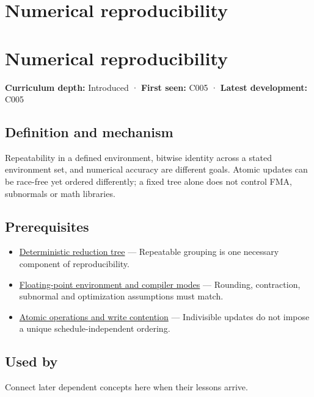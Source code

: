 \hypertarget{appendix-5f1a2c3f97ff}{}
\section*{Numerical reproducibility}
\section{Numerical reproducibility}\label{appendix-5f1a2c3f97ff-numerical-reproducibility}

\textbf{Curriculum depth:} Introduced · \textbf{First seen:} C005 · \textbf{Latest development:} C005

\subsection{Definition and mechanism}\label{appendix-5f1a2c3f97ff-definition-and-mechanism}

Repeatability in a defined environment, bitwise identity across a stated environment set, and numerical accuracy are different goals. Atomic updates can be race-free yet ordered differently; a fixed tree alone does not control FMA, subnormals or math libraries.

\subsection{Prerequisites}\label{appendix-5f1a2c3f97ff-prerequisites}

\begin{itemize}
\tightlist
\item
  \hyperref[appendix-4c8e0238e7ee]{Deterministic reduction tree} --- Repeatable grouping is one necessary component of reproducibility.
\item
  \hyperref[appendix-f11d1a521253]{Floating-point environment and compiler modes} --- Rounding, contraction, subnormal and optimization assumptions must match.
\item
  \hyperref[appendix-e12d1b03fefb]{Atomic operations and write contention} --- Indivisible updates do not impose a unique schedule-independent ordering.
\end{itemize}

\subsection{Used by}\label{appendix-5f1a2c3f97ff-used-by}

Connect later dependent concepts here when their lessons arrive.

